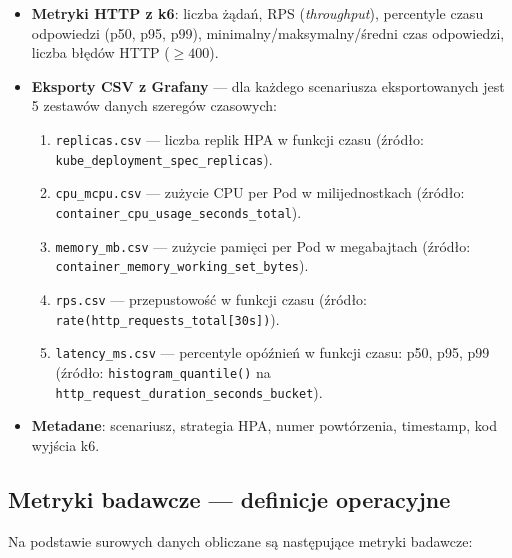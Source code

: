 \begin{itemize}
  \item \textbf{Metryki HTTP z k6}: liczba żądań, RPS (\textit{throughput}), percentyle czasu odpowiedzi (p50, p95, p99), minimalny/maksymalny/średni czas odpowiedzi, liczba błędów HTTP ($\geq 400$).

  \item \textbf{Eksporty CSV z Grafany} — dla każdego scenariusza eksportowanych jest 5 zestawów danych szeregów czasowych:
  \begin{enumerate}
    \item \texttt{replicas.csv} — liczba replik HPA w funkcji czasu (źródło: \texttt{kube\_deployment\_spec\_replicas}).
    \item \texttt{cpu\_mcpu.csv} — zużycie CPU per Pod w milijednostkach (źródło: \texttt{container\_cpu\_usage\_seconds\_total}).
    \item \texttt{memory\_mb.csv} — zużycie pamięci per Pod w megabajtach (źródło: \texttt{container\_memory\_working\_set\_bytes}).
    \item \texttt{rps.csv} — przepustowość w funkcji czasu (źródło: \texttt{rate(http\_requests\_total[30s])}).
    \item \texttt{latency\_ms.csv} — percentyle opóźnień w funkcji czasu: p50, p95, p99 (źródło: \texttt{histogram\_quantile()} na \texttt{http\_request\_duration\_seconds\_bucket}).
  \end{enumerate}

  \item \textbf{Metadane}: scenariusz, strategia HPA, numer powtórzenia, timestamp, kod wyjścia k6.
\end{itemize}

\subsection{Metryki badawcze — definicje operacyjne}

Na podstawie surowych danych obliczane są następujące metryki badawcze:

